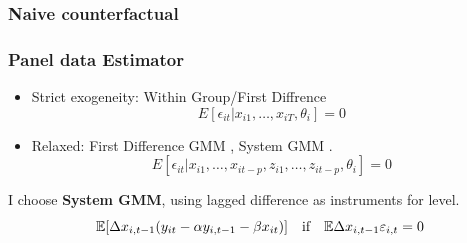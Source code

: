 \documentclass[10pt,mathserif]{beamer}
\begin{document}
\begin{frame}
  \frametitle{Naive counterfactual}

\end{frame}

\begin{frame}
  \frametitle{Panel data Estimator}
  \begin{itemize}\itemsep=12pt
    \item Strict exogeneity: Within Group/First Diffrence
          \begin{equation*}
            E[\epsilon_{it}|x_{i1},\ldots, x_{iT},\theta_i]=0
          \end{equation*}
    \item Relaxed: First Difference GMM \cite{arellano1991some}, System GMM
          \cite{arellano1995another,blundell1998initial}.
          \begin{equation*}
            E[\epsilon_{it}|x_{i1},\ldots, x_{it-p},z_{i1},\dots,z_{it-p},\theta_i]=0
          \end{equation*}
  \end{itemize}

  I choose \textbf{System GMM}, using lagged difference as instruments for level.
  \begin{equation*}
    \mathbb{E}[\Delta x_{i,t-1}(y_{it}-\alpha y_{i,t-1}-\beta x_{it})] \quad \text{if}\quad \mathbb{E}{\Delta x_{i,t-1}\varepsilon_{i,t}}=0
  \end{equation*}
\end{frame}
\end{document}
